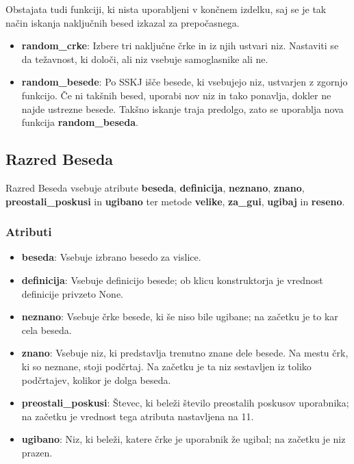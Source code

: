 \documentclass [a4paper, 12pt] {article}
\begin{document}
Obstajata tudi funkciji, ki nista uporabljeni v končnem izdelku, saj se je tak način iskanja naključnih besed izkazal za prepočasnega.
\begin {itemize}
\item \textbf {random\_crke}: Izbere tri naključne črke in iz njih ustvari niz. Nastaviti se da težavnost, ki določi, ali niz vsebuje samoglasnike ali ne.
\item \textbf {random\_besede}: Po SSKJ išče besede, ki vsebujejo niz, ustvarjen z zgornjo funkcijo. Če ni takšnih besed, uporabi nov niz in tako ponavlja, dokler ne najde ustrezne besede. Takšno iskanje traja predolgo, zato se uporablja nova funkcija \textbf {random\_beseda}.
\end {itemize}

\subsection {Razred Beseda}
Razred Beseda vsebuje atribute \textbf {beseda}, \textbf {definicija}, \textbf {neznano}, \textbf {znano}, \textbf {preostali\_poskusi} in \textbf {ugibano} ter metode \textbf {velike}, \textbf {za\_gui}, \textbf {ugibaj} in \textbf {reseno}.
\subsubsection {Atributi}
\begin {itemize}
\item \textbf {beseda}: Vsebuje izbrano besedo za vislice.
\item \textbf {definicija}: Vsebuje definicijo besede; ob klicu konstruktorja je vrednost definicije privzeto None.
\item \textbf {neznano}: Vsebuje črke besede, ki še niso bile ugibane; na začetku je to kar cela beseda. 
\item \textbf {znano}: Vsebuje niz, ki predstavlja trenutno znane dele besede. Na mestu črk, ki so neznane, stoji podčrtaj. Na začetku je ta niz sestavljen iz toliko podčrtajev, kolikor je dolga beseda.
\item \textbf {preostali\_poskusi}: Števec, ki beleži število preostalih poskusov uporabnika; na začetku je vrednost tega atributa nastavljena na 11. 
\item \textbf {ugibano}: Niz, ki beleži, katere črke je uporabnik že ugibal; na začetku je niz prazen.
\end {itemize}
\end{document}
